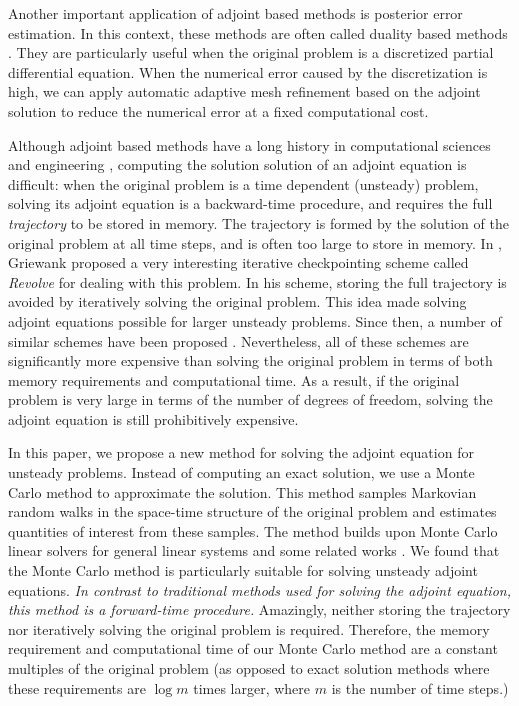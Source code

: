 \documentclass{elsart}
\theoremstyle{remark}
\theoremstyle{definition}
\theoremstyle{proof}
\begin{document}
    Another important application of adjoint based methods is posterior
    error estimation.  In this context, these methods are often called
    duality based methods \cite{Pierce2002} \cite{Giles2002} \cite{Hoffman2004}.
    They are particularly useful when the original problem is a 
    discretized partial differential equation.  When the numerical error
    caused by the discretization is high, we can apply automatic adaptive mesh
    refinement \cite{Hoffman2005} based on the adjoint solution to
    reduce the numerical error at a fixed computational cost.
    
    Although adjoint based methods have a long history in computational sciences
    and engineering \cite{Bryson1969}, computing the solution
    solution of an adjoint equation is difficult: when the original 
    problem is a time dependent (unsteady) problem, solving its adjoint
    equation is a backward-time procedure, and requires the full
    \emph{trajectory} to be stored in memory.  The trajectory is formed
    by the solution of the original problem at all time steps, and is 
    often too large to store in memory.  In \cite{Griewank1992}, Griewank
    proposed a very interesting iterative checkpointing scheme called
    \emph{Revolve} for dealing with this problem.  In his scheme, storing the
    full trajectory is
    avoided by iteratively solving the original problem.  This idea made 
    solving adjoint equations possible for larger unsteady problems.
    Since then, a number of similar schemes have been proposed
    \cite{Charpentier2001} \cite{Griewank2004}.  Nevertheless, all of these
    schemes are significantly more expensive than solving the original 
    problem in terms of both memory requirements and computational time.
    As a result, if the original problem is very large in terms of the number
    of degrees of freedom, solving the adjoint equation is still prohibitively
    expensive.
    
    In this paper, we propose a new method for solving the adjoint
    equation for unsteady problems.  Instead of computing an exact
    solution, we use a Monte Carlo method to approximate the solution.
    This method samples Markovian random walks in the space-time 
    structure of the original problem and estimates quantities of
    interest from these samples.  The method builds upon Monte Carlo
    linear solvers for general linear systems \cite{Forsythe1950}
    \cite{Dimov1998} \cite{Tan2002} \cite{Okten2005} and some related works
    \cite{Hanrahan2000}. 
    We found that the Monte Carlo method is particularly
    suitable for solving unsteady adjoint equations.  \emph{In contrast to
    traditional methods used for solving the adjoint equation, this method is
    a forward-time procedure.}  Amazingly, neither storing the trajectory 
    nor iteratively solving the original problem is required.  Therefore,
    the memory requirement and computational time of our Monte Carlo method
    are a constant multiples of the original problem (as opposed to exact
    solution methods where these requirements are $\log m$ times larger, where
    $m$ is the number of time steps.)
    
\end{document}
